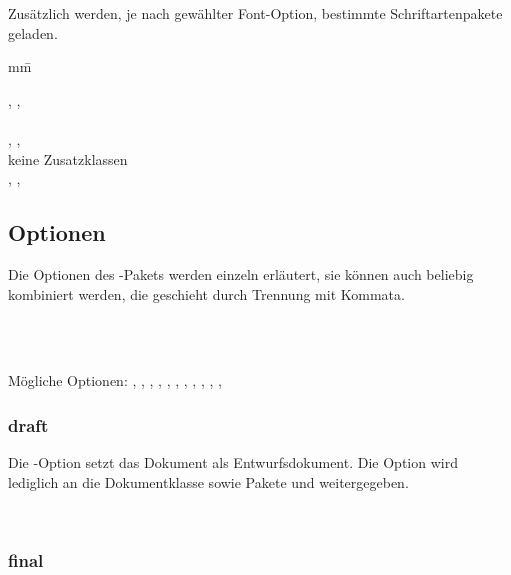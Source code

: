 Zusätzlich werden, je nach gewählter Font-Option, bestimmte Schriftartenpakete geladen.
\begin{tabbing}
	mm\=\kill

	\>, , \\
	\>\\
	\>, , \\
	\>keine Zusatzklassen\\
	\>, , 
\end{tabbing}


\subsection{Optionen}
\label{sec:userdoc:options}

Die Optionen des -Pakets werden einzeln erläutert, sie können auch beliebig kombiniert werden, die geschieht durch Trennung mit Kommata.

\begin{nutzung}
		\>\\
	\beispiel
		\>\\
		\>
\end{nutzung}

Mögliche Optionen: , , , , , , , , , , , 

\subsubsection{draft}

Die -Option setzt das Dokument als Entwurfsdokument.
Die Option wird lediglich an die Dokumentklasse sowie Pakete  und  weitergegeben.

\begin{nutzung}
		\>\\
\end{nutzung}

\subsubsection{final}

